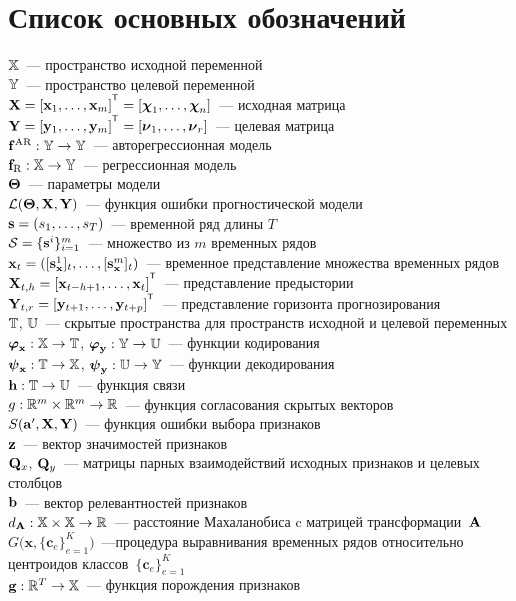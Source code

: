 \chapter*{Список основных обозначений}
\noindent 
$\mathbb{X}$~--- пространство исходной переменной \\
$\mathbb{Y}$~--- пространство целевой переменной \\
$\bX = [\bx_1, \dots, \bx_m]^{\T} =  [\bchi_1, \dots, \bchi_n]$~--- исходная матрица \\
$\bY = [\by_1, \dots, \by_m]^{\T} =  [\bnu_1, \dots, \bnu_r]$~--- целевая матрица  \\
$\mathbf{f}^{\text{AR}}: \mathbb{Y} \rightarrow \mathbb{Y}$~--- авторегрессионная модель \\
$\mathbf{f}_{\text{R}}: \mathbb{X} \rightarrow \mathbb{Y}$~--- регрессионная модель \\
$\boldsymbol{\Theta}$~--- параметры модели \\
$\mathcal{L}(\boldsymbol{\Theta}, \mathbf{X}, \mathbf{Y})$~--- функция ошибки прогностической модели \\
$\mathbf{s} = (s_1, \dots, s_T)$~--- временной ряд длины $T$ \\
$\mathcal{S} = \{\mathbf{s}^i\}_{i=1}^m$~--- множество из $m$ временных рядов \\
$\mathbf{x}_t = ([\mathbf{s}_{\mathbf{x}}^1]_t, \dots, [\mathbf{s}_{\mathbf{x}}^m]_t)$~--- временное представление множества временных рядов \\
$\bX_{t,h} = [\bx_{t - h + 1}, \dots, \bx_{t}]^{\T}$~--- представление предыстории \\
$\bY_{t,r} = [\by_{t + 1}, \dots, \by_{t + p}]^{\T}$~--- представление горизонта прогнозирования \\
$\mathbb{T}$, $\mathbb{U}$~--- скрытые пространства для пространств исходной и целевой переменных \\
$\boldsymbol{\varphi}_{\mathbf{x}}: \mathbb{X} \rightarrow \mathbb{T}$, $\boldsymbol{\varphi}_{\mathbf{y}}: \mathbb{Y} \rightarrow \mathbb{U}$~--- функции кодирования \\
$\boldsymbol{\psi}_{\mathbf{x}}: \mathbb{T} \rightarrow \mathbb{X}$, $\boldsymbol{\psi}_{\mathbf{y}}: \mathbb{U} \rightarrow \mathbb{Y}$~--- функции декодирования \\
$\mathbf{h}: \mathbb{T}\rightarrow \mathbb{U}$~--- функция связи \\
$g: \mathbb{R}^m \times \mathbb{R}^m \rightarrow \mathbb{R}$~--- функция согласования скрытых векторов \\
$S(\mathbf{a}', \mathbf{X}, \mathbf{Y})$~--- функция ошибки выбора признаков \\
$\mathbf{z}$~--- вектор значимостей признаков \\
$\mathbf{Q}_x$, $\mathbf{Q}_y$~--- матрицы парных взаимодействий исходных признаков и целевых столбцов \\
$\mathbf{b}$~--- вектор релевантностей признаков \\
$d_{\mathbf{A}}: \mathbb{X} \times \mathbb{X} \rightarrow \mathbb{R}$~--- расстояние Махаланобиса c матрицей	трансформации~$\mathbf{A}$ \\
$G\bigl(\mathbf{x}, \{\mathbf{c}_e\}_{e = 1} ^ K\bigr)$~---процедура выравнивания временных рядов относительно центроидов классов~$\{\mathbf{c}_e\}_{e = 1} ^ K$ \\
$\mathbf{g}: \mathbb{R}^T \rightarrow \mathbb{X}$~--- функция порождения признаков